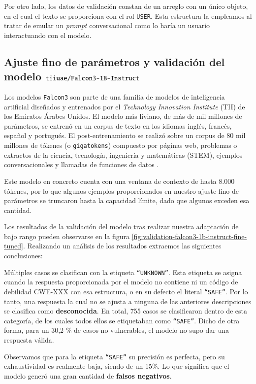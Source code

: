 \documentclass[12pt, a4paper, twoside]{article}
\begin{document}
Por otro lado, los datos de validación constan de un arreglo con un único objeto, en el cual el texto se proporciona con el rol \texttt{USER}. Esta estructura la empleamos al tratar de emular un \textit{prompt} conversacional como lo haría un usuario interactuando con el modelo.

\subsection{Ajuste fino de parámetros y validación del modelo $\protect\\ \texttt{tiiuae/Falcon3-1B-Instruct}$}
Los modelos \texttt{Falcon3} son parte de una familia de modelos de inteligencia artificial diseñados y entrenados por el \textit{Technology Innovation Institute} (TII) de los Emiratos Árabes Unidos. El modelo más liviano, de más de mil millones de parámetros, se entrenó en un corpus de texto en los idiomas inglés, francés, español y portugués. El post-entrenamiento se realizó sobre un corpus de 80 mil millones de tókenes (o \texttt{gigatokens}) compuesto por páginas web, problemas o extractos de la ciencia, tecnología, ingeniería y matemáticas (STEM), ejemplos conversacionales y llamadas de funciones de datos \cite{falcon-1b-huggingface}.

Este modelo en concreto cuenta con una ventana de contexto de hasta 8.000 tókenes, por lo que algunos ejemplos proporcionados en nuestro ajuste fino de parámetros se truncaron hasta la capacidad límite, dado que algunos exceden esa cantidad.

Los resultados de la validación del modelo tras realizar nuestra adaptación de bajo rango pueden observarse en la figura \ref{fig:validation-falcon3-1b-instruct-fine-tuned}. Realizando un análisis de los resultados extraemos las siguientes conclusiones:

Múltiples casos se clasifican con la etiqueta \texttt{\enquote{UNKNOWN}}. Esta etiqueta se asigna cuando la respuesta proporcionada por el modelo no contiene ni un código de debilidad CWE-XXX con esa estructura, o en su defecto el literal \texttt{\enquote{SAFE}}. Por lo tanto, una respuesta la cual no se ajusta a ninguna de las anteriores descripciones se clasifica como \textbf{desconocida}. En total, 755 casos se clasificaron dentro de esta categoría, de los cuales todos ellos se etiquetaban como \texttt{\enquote{SAFE}}. Dicho de otra forma, para un 30,2 \% de casos no vulnerables, el modelo no supo dar una respuesta válida.

Observamos que para la etiqueta \texttt{\enquote{SAFE}} su precisión es perfecta, pero su exhaustividad es realmente baja, siendo de un 15\%. Lo que significa que el modelo generó una gran cantidad de \textbf{falsos negativos}. 
\end{document}
